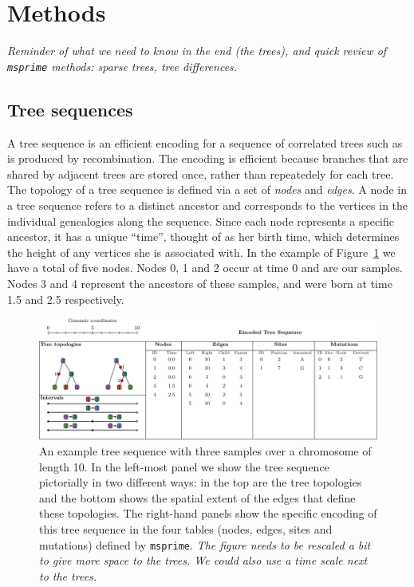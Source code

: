 \documentclass{article}
\newcommand{\msprime}{\texttt{msprime}}
\newcommand{\plr}[1]{{\em \color{blue} #1}}
\newcommand{\jk}[1]{{\em \color{red} #1}}
\begin{document}
\section*{Methods}

\plr{Reminder of what we need to know in the end (the trees), and
    quick review of \msprime{} methods: sparse trees, tree differences.}

\subsection*{Tree sequences}
A tree sequence is an efficient encoding for a sequence of correlated trees such as
is produced by recombination. The encoding is efficient because branches that are
shared by adjacent trees are stored once, rather than repeatedely for each tree.
The topology of a tree sequence is defined via a set of \emph{nodes} and
\emph{edges}. A node in a tree sequence refers to a distinct ancestor and
corresponds to the vertices in the individual genealogies along the sequence.
Since each node represents a specific ancestor, it has a unique ``time'',
thought of as her birth time, which determines the height of any vertices
she is associated with. In the example of Figure~\ref{fig:example_tree_sequence}
we have a total of five nodes. Nodes 0, 1 and 2 occur at time 0 and are our
samples. Nodes 3 and 4 represent the ancestors of these samples, and were born at
time 1.5 and 2.5 respectively.

\begin{figure}
    \begin{center}
        \includegraphics[width=\textwidth]{example_tree_sequence}
    \end{center}
    \caption{
        An example tree sequence with three samples over a chromosome of length 10. In the
        left-most panel we show the tree sequence pictorially in two different ways:
        in the top are the tree topologies and the bottom shows the spatial extent of the
        edges that define these topologies. The right-hand panels show the specific encoding
        of this tree sequence in the four tables (nodes, edges, sites and mutations) defined
        by \msprime.
        \jk{The figure needs to be rescaled a bit to give more space to the trees. We could also use a
        time scale next to the trees.}
        \label{fig:example_tree_sequence}
    }
\end{figure}
\end{document}
